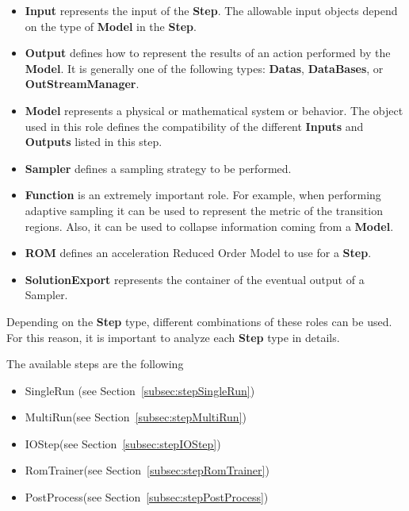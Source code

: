 \begin{itemize}
\item \textbf{Input} represents the input of the \textbf{Step}.
The allowable input objects depend on the type of \textbf{Model} in the
\textbf{Step}.
\item \textbf{Output} defines how to represent the results of an action
performed by the \textbf{Model}.
It is generally one of the following types: \textbf{Datas}, \textbf{DataBases}, 
or \textbf{OutStreamManager}.
\item \textbf{Model} represents a physical or mathematical system or behavior.
The object used in this role defines the compatibility of the different
\textbf{Inputs} and \textbf{Outputs} listed in this step.
\item \textbf{Sampler} defines a sampling strategy to be performed.
\item \textbf{Function} is an extremely important role.
For example, when performing adaptive sampling it can be used to represent the
metric of the transition regions.
Also, it can be used to collapse information coming from a \textbf{Model}.
\item \textbf{ROM} defines an acceleration Reduced Order Model to use for a 
\textbf{Step}.
\item \textbf{SolutionExport} represents the container of the eventual output
of a Sampler.
\end{itemize}
Depending on the \textbf{Step} type, different combinations of these roles can
be used.
For this reason, it is important to analyze each \textbf{Step} type in details.

The available steps are the following
\begin{itemize}
\item SingleRun (see Section~\ref{subsec:stepSingleRun})
\item MultiRun(see Section~\ref{subsec:stepMultiRun})
\item IOStep(see Section~\ref{subsec:stepIOStep})
\item RomTrainer(see Section~\ref{subsec:stepRomTrainer})
\item PostProcess(see Section~\ref{subsec:stepPostProcess})
\end{itemize}


